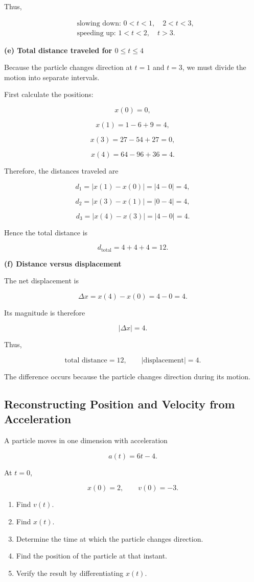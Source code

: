 \documentclass[../main.tex]{subfiles}
\theoremstyle{remark}
\begin{document}
Thus,

\[
\boxed{
\begin{aligned}
&\text{slowing down: } 0<t<1,\quad 2<t<3,\\
&\text{speeding up: } 1<t<2,\quad t>3.
\end{aligned}
}
\]

\textbf{(e) Total distance traveled for \(0\leq t\leq4\)}

Because the particle changes direction at \(t=1\) and \(t=3\), we must divide the motion into separate intervals.

First calculate the positions:

\[
x(0)=0,
\]

\[
x(1)=1-6+9=4,
\]

\[
x(3)=27-54+27=0,
\]

\[
x(4)=64-96+36=4.
\]

Therefore, the distances traveled are

\[
d_1=|x(1)-x(0)|=|4-0|=4,
\]

\[
d_2=|x(3)-x(1)|=|0-4|=4,
\]

\[
d_3=|x(4)-x(3)|=|4-0|=4.
\]

Hence the total distance is

\[
\boxed{
d_{\mathrm{total}}=4+4+4=12.
}
\]

\textbf{(f) Distance versus displacement}

The net displacement is

\[
\Delta x=x(4)-x(0)=4-0=4.
\]

Its magnitude is therefore

\[
|\Delta x|=4.
\]

Thus,

\[
\boxed{
\text{total distance}=12,
\qquad
|\text{displacement}|=4.
}
\]

The difference occurs because the particle changes direction during its motion.


\subsection{Reconstructing Position and Velocity from Acceleration}

A particle moves in one dimension with acceleration

\[
a(t)=6t-4.
\]

At \(t=0\),

\[
x(0)=2,
\qquad
v(0)=-3.
\]

\begin{enumerate}
    \item Find \(v(t)\).
    \item Find \(x(t)\).
    \item Determine the time at which the particle changes direction.
    \item Find the position of the particle at that instant.
    \item Verify the result by differentiating \(x(t)\).
\end{enumerate}
\end{document}
